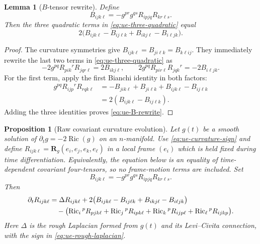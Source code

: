 \documentclass[10pt]{coll-l}
\newtheorem{lemma}[theorem]{Lemma}
\newtheorem{proposition}[theorem]{Proposition}
\theoremstyle{definition}
\theoremstyle{remark}
\numberwithin{section}{chapter}
\numberwithin{equation}{chapter}
\newcommand{\Ric}{\operatorname{Ric}}
\begin{document}
\begin{lemma}[$B$-tensor rewrite]
\label{lem:ue-B-rewrite}
Define
\[
 B_{ijk\ell}=-g^{pr}g^{qs}R_{ipjq}R_{kr\ell s}.
\]
Then the three quadratic terms in
\eqref{eq:ue-three-quadratic} equal
\begin{equation}
 2\bigl(B_{ijk\ell}-B_{ij\ell k}
             +B_{ikj\ell}-B_{i\ell jk}\bigr).             \label{eq:ue-B-rewrite}
\end{equation}
\end{lemma}

\begin{proof}
The curvature symmetries give
$B_{ijk\ell}=B_{ji\ell k}=B_{k\ell ij}$.  They immediately rewrite the
last two terms in \eqref{eq:ue-three-quadratic} as
\[
 -2g^{pq}R_{pik}{}^rR_{jqr\ell}=2B_{ikj\ell},
 \qquad
 2g^{pq}R_{pir\ell}R_{jqk}{}^r=-2B_{i\ell jk}.
\]
For the first term, apply the first Bianchi identity in both factors:
\begin{align*}
 g^{pq}R_{ijp}{}^rR_{rqk\ell}
  &=-B_{jik\ell}+B_{ji\ell k}+B_{ijk\ell}-B_{ij\ell k}\\
  &=2(B_{ijk\ell}-B_{ij\ell k}).
\end{align*}
Adding the three identities proves \eqref{eq:ue-B-rewrite}.
\end{proof}

\begin{proposition}[Raw covariant curvature evolution]
\label{prop:ue-raw-curvature-evolution}
Let $g(t)$ be a smooth solution of $\partial_tg=-2\Ric(g)$ on an
$n$-manifold.  Use \eqref{eq:ue-curvature-sign} and define
$R_{ijk\ell}=\mathbf R_g(e_i,e_j,e_k,e_\ell)$ in a local frame
$(e_i)$ which is held fixed during time differentiation.  Equivalently,
the equation below is an equality of time-dependent covariant
four-tensors, so no frame-motion terms are included.  Set
\begin{equation}
 B_{ijk\ell}
   =-g^{pr}g^{qs}R_{ipjq}R_{kr\ell s}.                  \label{eq:ue-B-unpulled}
\end{equation}
Then
\begin{align}
 \partial_tR_{ijk\ell}
 &=\Delta R_{ijk\ell}
   +2\bigl(
       B_{ijk\ell}-B_{ij\ell k}+B_{ikj\ell}-B_{i\ell jk}
     \bigr)                                             \label{eq:ue-raw-rm-evolution}\\
 &\quad-
  \bigl(
    \Ric_i{}^pR_{pjk\ell}
   +\Ric_j{}^pR_{ipk\ell}
   +\Ric_k{}^pR_{ijp\ell}
   +\Ric_\ell{}^pR_{ijkp}
  \bigr).\notag
\end{align}
Here $\Delta$ is the rough Laplacian formed from $g(t)$ and its
Levi--Civita connection, with the sign in
\eqref{eq:ue-rough-laplacian}.
\end{proposition}
\end{document}
